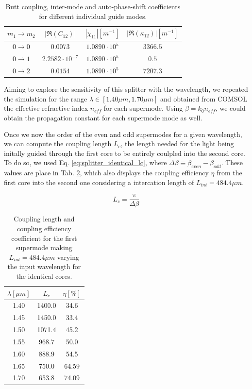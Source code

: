 \documentclass[conference, a4paper]{IEEEtran}
\begin{document}
\begin{table}[H]
    \centering
    \begin{tabular}{cccc}
        \toprule
        $m_1 \rightarrow m_2$ & $|\Re(C_{12})|$ & $|\chi_{11}| [m^{-1}]$ & $|\Re(\kappa_{12})| [m^{-1}]$ \\ 
        \midrule
        $0 \rightarrow 0$ & $0.0073$ & $1.0890 \cdot 10^5$ & $3366.5$ \\
        $0 \rightarrow 1$ & $2.2582 \cdot 10^{-7}$ & $1.0890 \cdot 10^5$ & $0.5$ \\
        $0 \rightarrow 2$ & $0.0154$ & $1.0890 \cdot 10^5$ & $7207.3$ \\
        \bottomrule
    \end{tabular}
    \caption{Butt coupling, inter-mode and auto-phase-shift coefficients for different individual guide modes.}
    \label{tab:splitter_identical_coefficients}
\end{table}

Aiming to explore the sensitivity of this splitter with the wavelength, we repeated the simulation for the range $\lambda \in [1.40 \mu m, 1.70 \mu m]$ and obtained from COMSOL the effective refractive index $n_{eff}$ for each supermode. Using $\beta = k_0 n_{eff}$, we could obtain the propagation constant for each supermode mode as well.

Once we now the order of the even and odd supermodes for a given wavelength, we can compute the coupling length $L_c$, the length needed for the light being initally guided through the first core to be entirely coulpled into the second core. To do so, we used Eq. \eqref{eq:splitter_identical_lc}, where $\Delta \beta \equiv \beta_{even} - \beta_{odd}$. These values are place in Tab. \ref{tab:splitter_identical_lc}, which also displays the coupling efficiency $\eta$ from the first core into the second one considering a intercation length of $L_{int} = 484.4\mu m$.

\begin{equation}
    L_c = \frac{\pi}{\Delta \beta}
    \label{eq:splitter_identical_lc}
\end{equation}

\begin{table}[H]
    \centering
    \begin{tabular}{ccc}
        \toprule
        $\lambda [\mu m]$ & $L_c$ & $\eta[\%]$ \\
        \midrule
        1.40 & 1400.0 & 34.6 \\
        1.45 & 1450.0 & 33.4 \\
        1.50 & 1071.4 & 45.2 \\
        1.55 & 968.7 & 50.0 \\
        1.60 & 888.9 & 54.5 \\
        1.65 & 750.0 & 64.59 \\
        1.70 & 653.8 & 74.09 \\    
        \bottomrule
    \end{tabular}
    \caption{Coupling length and coupling efficiency coefficient for the first supermode making $L_{int} = 484.4\mu m$ varying the input wavelength for the identical cores.}
    \label{tab:splitter_identical_lc}
\end{table}
\end{document}
